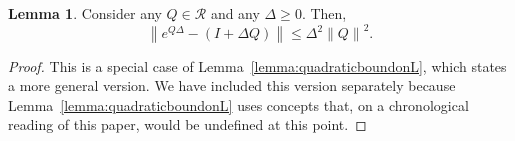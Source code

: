 \documentclass[10pt,a4paper]{paper}
\theoremstyle{definition}
\newtheorem{lemma}[theorem]{Lemma}
\newcommand{\reals}{\mathbb{R}}
\newcommand{\realspos}{\reals_{>0}}
\newcommand{\norm}[1]{\left\lVert #1 \right\rVert}
\newcommand{\coloneqq}{:\!=}
\begin{document}
\begin{lemma}\label{lemma:linearpartofexponential}
Consider any $Q\in\mathcal{R}$ and any $\Delta\geq0$. Then,
\begin{equation*}
\norm{e^{Q\Delta}-(I+\Delta Q)}\leq
\Delta^2\norm{Q}^2.
\end{equation*}
\end{lemma}
\begin{proof}
This is a special case of Lemma~\ref{lemma:quadraticboundonL}, which states a more general version. We have included this version separately because Lemma~\ref{lemma:quadraticboundonL} uses concepts that, on a chronological reading of this paper, would be undefined at this point.
%
\end{proof}
\end{document}
